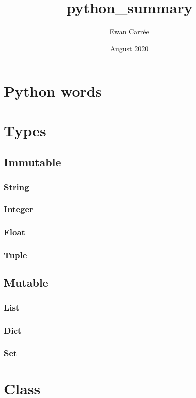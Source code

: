 \documentclass{article}
\title{\textbf{python\_summary}}
\author{Ewan Carrée}
\date{August 2020}
\begin{document}
\maketitle
\newpage

\tableofcontents

\newpage
\section{Python words}

\newpage
\section{Types}
\subsection{Immutable}
\subsubsection{String}
\subsubsection{Integer}
\subsubsection{Float}
\subsubsection{Tuple}

\subsection{Mutable}
\subsubsection{List}
\subsubsection{Dict}
\subsubsection{Set}

\newpage
\section{Class}
\end{document}
